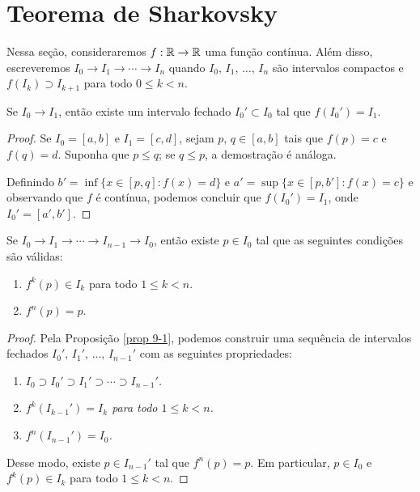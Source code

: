 \section{Teorema de Sharkovsky}

Nessa seção, consideraremos $f: \mathbb{R} \to \mathbb{R}$ uma função contínua.
Além disso, escreveremos $I_0 \longrightarrow I_1 \longrightarrow \cdots \longrightarrow I_n$ quando $I_0, \, I_1, \, \dots, \, I_n$ são intervalos compactos e $f(I_k) \supset I_{k+1}$ para todo $0 \leq k < n$.

\begin{proposition}\label{prop 9-1}
Se $I_0 \longrightarrow I_1$, então existe um intervalo fechado $I_0' \subset I_0$ tal que $f(I_0') = I_1$.
\end{proposition}

\begin{proof}
Se $I_0 = [a, b]$ e $I_1 = [c, d]$, sejam $p, \, q \in [a, b]$ tais que $f(p) = c$ e $f(q) = d$.
Suponha que $p \leq q$; se $q \leq p$, a demostração é análoga.

Definindo $b' = \inf \lbrace x \in [p, q] : f(x) = d \rbrace$ e $a' = \sup \lbrace x \in [p, b'] : f(x) = c \rbrace$ e observando que $f$ é contínua, podemos concluir que $f(I_0') = I_1$, onde $I_0' = [a', b']$.
\end{proof}

\begin{lemma}
Se $I_0 \longrightarrow I_1 \longrightarrow \cdots \longrightarrow I_{n-1} \longrightarrow I_0$, então existe $p \in I_0$ tal que as seguintes condições são válidas:
\begin{enumerate}
\item $f^k(p) \in I_k$ para todo $1 \leq k < n$.
\item $f^n(p) = p$.
\end{enumerate}
\end{lemma}

\begin{proof}
Pela Proposição \ref{prop 9-1}, podemos construir uma sequência de intervalos fechados $I_0', \, I_1', \, \dots, \, I_{n-1}'$ com as seguintes propriedades:
\begin{enumerate}[label=\alph*)]
\item \textit{$I_0 \supset I_0' \supset I_1' \supset \cdots \supset I_{n-1}'$.}
\item \textit{$f^k(I_{k-1}') = I_k$ para todo $1 \leq k < n$.}
\item \textit{$f^n(I_{n-1}') = I_0$.}
\end{enumerate}

Desse modo, existe $p \in I_{n-1}'$ tal que $f^n(p) = p$.
Em particular, $p \in I_0$ e $f^k(p) \in I_k$ para todo $1 \leq k < n$.
\end{proof}

